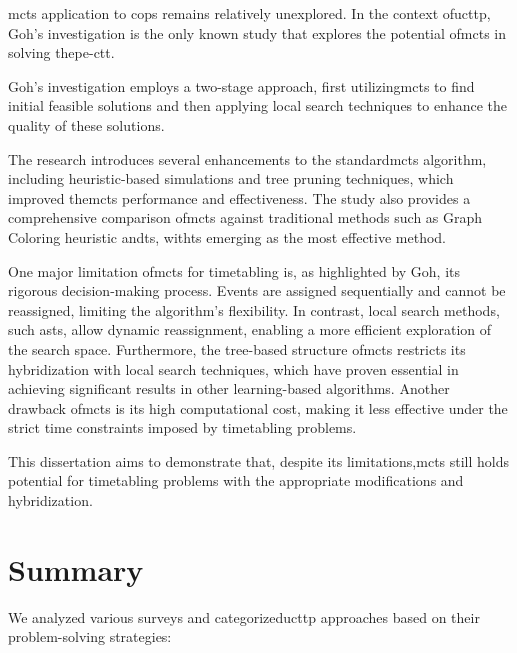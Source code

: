 \ac{mcts} application to \acp{cop} remains relatively unexplored. In the context of\ac{ucttp}, Goh's investigation \cite{goh_MCTS} is the only known study that explores the potential of\ac{mcts} in solving the\ac{pe-ctt}. 

Goh's investigation employs a two-stage approach, first utilizing\ac{mcts} to find initial feasible solutions and then applying local search techniques to enhance the quality of these solutions.

The research introduces several enhancements to the standard\ac{mcts} algorithm, including heuristic-based simulations and tree pruning techniques, which improved the\ac{mcts} performance and effectiveness. The study also provides a comprehensive comparison of\ac{mcts} against traditional methods such as Graph Coloring heuristic and\ac{ts}, with\ac{ts} emerging as the most effective method.

One major limitation of\ac{mcts} for timetabling is, as highlighted by Goh, its rigorous decision-making process. Events are assigned sequentially and cannot be reassigned, limiting the algorithm's flexibility. In contrast, local search methods, such as\ac{ts}, allow dynamic reassignment, enabling a more efficient exploration of the search space. Furthermore, the tree-based structure of\ac{mcts} restricts its hybridization with local search techniques, which have proven essential in achieving significant results in other learning-based algorithms. Another drawback of\ac{mcts} is its high computational cost, making it less effective under the strict time constraints imposed by timetabling problems.

This dissertation aims to demonstrate that, despite its limitations,\ac{mcts} still holds potential for timetabling problems with the appropriate modifications and hybridization. 

\section{Summary}

We analyzed various surveys \cite{lewis_survey_2008,abdipoor_meta-heuristic_2023,babaei_survey_2015,chen_survey_2021} and categorized\ac{ucttp} approaches based on their problem-solving strategies:

